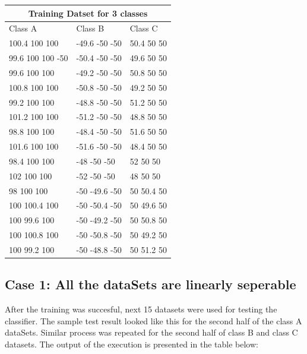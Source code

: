 \documentclass[letterpaper]{article}
\begin{document}
  \begin{tabular}{ |p{5cm}|p{3cm}|p{3cm}| }
 \hline
 \multicolumn{3}{|c|}{Training Datset for 3 classes} \\
 \hline
Class A& Class B & Class C\\
 \hline
100.4 100 100 & -49.6 -50 -50 & 50.4 50 50 \\
99.6 100 100 -50 & -50.4 -50 -50 & 49.6 50 50 \\
99.6 100 100 & -49.2 -50 -50 & 50.8 50 50 \\
100.8 100 100 & -50.8 -50 -50 & 49.2 50 50 \\
99.2 100 100 & -48.8 -50 -50 & 51.2 50 50 \\
101.2 100 100 & -51.2 -50 -50 & 48.8 50 50 \\
98.8 100 100 & -48.4 -50 -50 & 51.6 50 50 \\
101.6 100 100 & -51.6 -50 -50 & 48.4 50 50 \\
98.4 100 100 & -48 -50 -50 & 52 50 50 \\
102 100 100 & -52 -50 -50 & 48 50 50 \\
98 100 100 & -50 -49.6 -50 & 50 50.4 50 \\
100 100.4 100 & -50 -50.4 -50 & 50 49.6 50 \\
100 99.6 100 & -50 -49.2 -50 & 50 50.8 50 \\
100 100.8 100 & -50 -50.8 -50 & 50 49.2 50 \\
100 99.2 100 & -50 -48.8 -50 & 50 51.2 50 \\

 \hline

\end {tabular}

  \subsection {Case 1: All the dataSets are linearly seperable}
  After the training was succesful, next 15 datasets were used for testing the classifier. The sample test result looked like this for the second half of the class A dataSets. Similar process was repeated for the second half of class B and class C datasets. The output of the execution is presented in the table below: 
\end{document}
